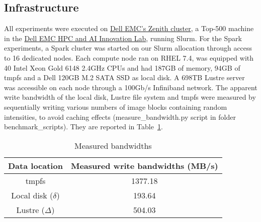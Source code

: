 \documentclass{IEEEtran}
\newcommand{\todo}[1]{\marginpar{\parbox{18mm}{\flushleft\tiny\color{red}\textbf{TODO}:
      #1}}}
\begin{document}





\subsection{Infrastructure} %

 All experiments were executed on 
 \href{https://www.dellemc.com/resources/en-us/asset/sales-documents/products/storage/h16221-hpc-lab-brochure.pdf}{Dell 
 EMC's Zenith cluster}, a Top-500 machine in the 
 \href{https://www.dellemc.com/en-us/solutions/high-performance-computing/HPC-AI-Innovation-Lab.htm}{Dell 
 EMC HPC and AI Innovation Lab}, running Slurm. For the Spark 
 experiments, a Spark cluster was started on our 
 Slurm allocation through access to 16 dedicated nodes. Each compute 
 node ran on RHEL 7.4, was 
 equipped with 40 Intel Xeon Gold 6148 2.4GHz CPUs and had
 187GB of memory, 94GB of tmpfs and a Dell 120GB M.2 SATA SSD as local disk. 
 A 698TB Lustre server was accessible on each node through a 100Gb/s 
 Infiniband network. The apparent write bandwidth of the local disk, 
 Lustre file system and tmpfs were measured by sequentially writing various numbers
 of image blocks containing random intensities, to avoid 
 caching effects (measure\_bandwidth.py script in folder 
 benchmark\_scripts). They are reported in Table~\ref{table:bdwdths}.

\begin{table}
\centering
\begin{tabular}{c|c}
\rowcolor{headcolor}
Data location & Measured write bandwidths (MB/s)\\
\hline
tmpfs                 & 1377.18 \\
Local disk ($\delta$) & 193.64  \\
Lustre   ($\Delta$)   & 504.03 \\
\end{tabular}
\caption{Measured bandwidths}
\label{table:bdwdths}
\end{table}
\end{document}
